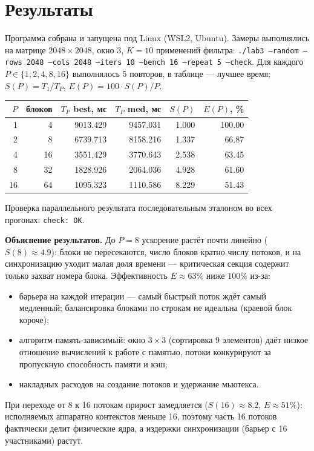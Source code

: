 \section{Результаты}

Программа собрана и запущена под Linux (WSL2, Ubuntu). Замеры выполнялись на матрице
$2048\times2048$, окно 3, $K=10$ применений фильтра: \texttt{./lab3 --random --rows 2048
--cols 2048 --iters 10 --bench 16 --repeat 5 --check}. Для каждого $P\in\{1,2,4,8,16\}$
выполнялось 5 повторов, в таблице --- лучшее время; $S(P)=T_1/T_P$, $E(P)=100\cdot S(P)/P$.

\begin{center}
\begin{tabular}{rrrrrr}
\hline
$P$ & блоков & $T_P$ best, мс & $T_P$ med, мс & $S(P)$ & $E(P)$, \% \\
\hline
1  & 4  & 9013.429 & 9457.031 & 1.000 & 100.00 \\
2  & 8  & 6739.713 & 8158.216 & 1.337 & 66.87 \\
4  & 16 & 3551.429 & 3770.643 & 2.538 & 63.45 \\
8  & 32 & 1828.926 & 2064.036 & 4.928 & 61.60 \\
16 & 64 & 1095.323 & 1110.586 & 8.229 & 51.43 \\
\hline
\end{tabular}
\end{center}

Проверка параллельного результата последовательным эталоном во всех прогонах:
\texttt{check: OK}.

\textbf{Объяснение результатов.} До $P=8$ ускорение растёт почти линейно ($S(8)\approx 4.9$):
блоки не пересекаются, число блоков кратно числу потоков, и на синхронизацию уходит малая доля
времени --- критическая секция содержит только захват номера блока. Эффективность
$E\approx 63\%$ ниже $100\%$ из-за:
\begin{itemize}
  \item барьера на каждой итерации --- самый быстрый поток ждёт самый медленный; балансировка
    блоками по строкам не идеальна (краевой блок короче);
  \item алгоритм память-зависимый: окно $3\times3$ (сортировка 9 элементов) даёт низкое
    отношение вычислений к работе с памятью, потоки конкурируют за пропускную способность
    памяти и кэш;
  \item накладных расходов на создание потоков и удержание мьютекса.
\end{itemize}
При переходе от 8 к 16 потокам прирост замедляется ($S(16)\approx 8.2$, $E\approx 51\%$):
исполняемых аппаратно контекстов меньше 16, поэтому часть 16 потоков фактически делит
физические ядра, а издержки синхронизации (барьер с 16 участниками) растут.

